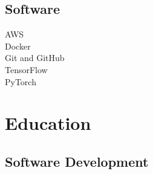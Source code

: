 \documentclass[letterpaper]{deedy-resume} %
\begin{document}
\begin{minipage}[t]{0.33\textwidth}


\sectionspace %


\sectionspace %

\subsection{Software}
AWS \\
Docker \\
Git and GitHub \\
TensorFlow \\
PyTorch \\


\sectionspace %


\section{Education} 

\subsection{Software Development}


\end{minipage}
\end{document}
